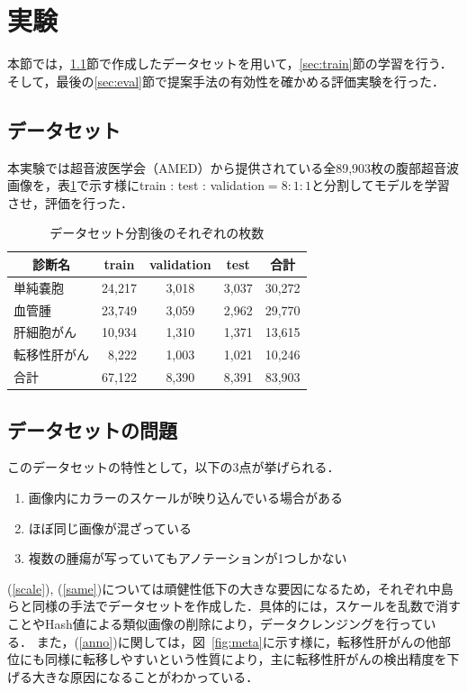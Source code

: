 \documentclass[a4j,8pt,twocolumn]{extarticle}
\begin{document}
    \section{実験}
        本節では，\ref{sec:dataset}節で作成したデータセットを用いて，\ref{sec:train}節の学習を行う．そして，最後の\ref{sec:eval}節で提案手法の有効性を確かめる評価実験を行った．

        \subsection{データセット}
        \label{sec:dataset}
            本実験では超音波医学会（AMED）から提供されている全89,903枚の腹部超音波画像を，表\ref{tab:dataset}で示す様にtrain : test : validation$ = 8 : 1 : 1$と分割してモデルを学習させ，評価を行った．

            \begin{table}[t]
                \centering
                \caption{データセット分割後のそれぞれの枚数}
                \label{tab:dataset}
                    \begin{tabular}{l|rcr|c} \hline
                        \multicolumn{1}{c|}{診断名} & \multicolumn{1}{c}{train} & validation & \multicolumn{1}{c|}{test} & 合計 \\ \hline
                        単純嚢胞 & 24,217 & 3,018 & 3,037 & 30,272 \\
                        血管腫 & 23,749 & 3,059 & 2,962 & 29,770 \\
                        肝細胞がん & 10,934 & 1,310 & 1,371 & 13,615 \\
                        転移性肝がん & 8,222 & 1,003 & 1,021 & 10,246 \\ \hline
                        合計 & 67,122 & 8,390 & 8,391 & 83,903 \\ \hline
                    \end{tabular}
            \end{table}

        \subsection{データセットの問題}
            \label{sec:data_prob}
            このデータセットの特性として，以下の3点が挙げられる．
            \begin{enumerate}
                \item 画像内にカラーのスケールが映り込んでいる場合がある \label{scale}
                \item ほぼ同じ画像が混ざっている \label{same}
                \item 複数の腫瘍が写っていてもアノテーションが1つしかない \label{anno}
            \end{enumerate}
            (\ref{scale}), (\ref{same})については頑健性低下の大きな要因になるため，それぞれ中島ら\cite{nakashima2020study}と同様の手法でデータセットを作成した．具体的には，スケールを乱数で消すことやHash値による類似画像の削除により，データクレンジングを行っている．
            また，(\ref{anno})に関しては，図~\ref{fig:meta}に示す様に，転移性肝がんの他部位にも同様に転移しやすいという性質により，主に転移性肝がんの検出精度を下げる大きな原因になることがわかっている．
\end{document}
